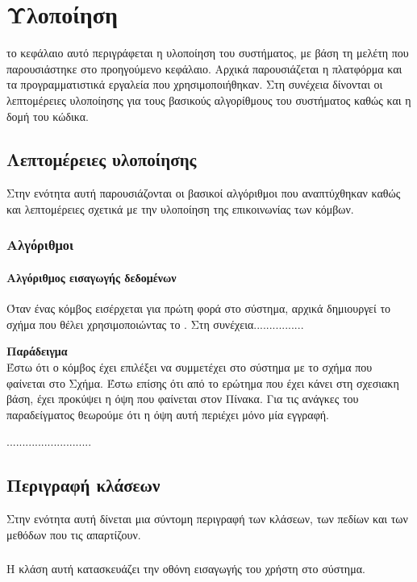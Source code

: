 \chapter{Υλοποίηση}
το κεφάλαιο αυτό περιγράφεται η υλοποίηση του συστήματος, με βάση τη μελέτη που παρουσιάστηκε στο προηγούμενο κεφάλαιο. Αρχικά παρουσιάζεται η πλατφόρμα και τα προγραμματιστικά εργαλεία που χρησιμοποιήθηκαν. Στη συνέχεια δίνονται οι λεπτομέρειες υλοποίησης για τους βασικούς αλγορίθμους του συστήματος καθώς και η δομή του κώδικα.

\section{Λεπτομέρειες υλοποίησης}
Στην ενότητα αυτή παρουσιάζονται οι βασικοί αλγόριθμοι που
αναπτύχθηκαν καθώς και λεπτομέρειες σχετικά με την υλοποίηση της
επικοινωνίας των κόμβων.

\subsection{Αλγόριθμοι}

\subsubsection{Αλγόριθμος εισαγωγής δεδομένων}
Όταν ένας κόμβος εισέρχεται για πρώτη φορά στο σύστημα, αρχικά
δημιουργεί το σχήμα που θέλει χρησιμοποιώντας το .
Στη συνέχεια................

\noindent\textbf{Παράδειγμα} \\

Έστω ότι ο κόμβος έχει επιλέξει να συμμετέχει στο σύστημα με το  σχήμα που φαίνεται
στο Σχήμα. Έστω επίσης ότι από το  ερώτημα που έχει κάνει στη σχεσιακη
βάση, έχει προκύψει η όψη που φαίνεται στον Πίνακα. Για τις ανάγκες του παραδείγματος θεωρούμε
ότι η όψη αυτή περιέχει μόνο μία εγγραφή.

...........................

\section{Περιγραφή κλάσεων}
Στην ενότητα αυτή δίνεται μια σύντομη περιγραφή των κλάσεων,
των πεδίων και των μεθόδων που τις απαρτίζουν.

\subsection{}
\noindent Η κλάση αυτή κατασκευάζει την οθόνη εισαγωγής του χρήστη στο σύστημα.\\

